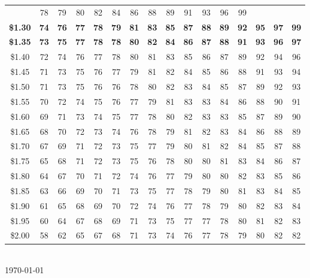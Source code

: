 \documentclass{article}
\begin{document}
\begin{tabular}{|c|*{15}{c}|}
& 78 & 79 & 80 & 82 & 84 & 86 & 88 & 89 & 91 & 93 & 96 & 99 & \\\textbf{\$1.30} & \textbf{74} & \textbf{76} & \textbf{77} & \textbf{78} & \textbf{79} & \textbf{81} & \textbf{83} & \textbf{85} & \textbf{87} & \textbf{88} & \textbf{89} & \textbf{92} & \textbf{95} & \textbf{97} & \textbf{99}\\\textbf{\$1.35} & \textbf{73} & \textbf{75} & \textbf{77} & \textbf{78} & \textbf{78} & \textbf{80} & \textbf{82} & \textbf{84} & \textbf{86} & \textbf{87} & \textbf{88} & \textbf{91} & \textbf{93} & \textbf{96} & \textbf{97}\\\$1.40 & 72 & 74 & 76 & 77 & 78 & 80 & 81 & 83 & 85 & 86 & 87 & 89 & 92 & 94 & 96\\\$1.45 & 71 & 73 & 75 & 76 & 77 & 79 & 81 & 82 & 84 & 85 & 86 & 88 & 91 & 93 & 94\\\$1.50 & 71 & 73 & 75 & 76 & 76 & 78 & 80 & 82 & 83 & 84 & 85 & 87 & 89 & 92 & 93\\\$1.55 & 70 & 72 & 74 & 75 & 76 & 77 & 79 & 81 & 83 & 83 & 84 & 86 & 88 & 90 & 91\\\$1.60 & 69 & 71 & 73 & 74 & 75 & 77 & 78 & 80 & 82 & 83 & 83 & 85 & 87 & 89 & 90\\\$1.65 & 68 & 70 & 72 & 73 & 74 & 76 & 78 & 79 & 81 & 82 & 83 & 84 & 86 & 88 & 89\\\$1.70 & 67 & 69 & 71 & 72 & 73 & 75 & 77 & 79 & 80 & 81 & 82 & 84 & 85 & 87 & 88\\\$1.75 & 65 & 68 & 71 & 72 & 73 & 75 & 76 & 78 & 80 & 80 & 81 & 83 & 84 & 86 & 87\\\$1.80 & 64 & 67 & 70 & 71 & 72 & 74 & 76 & 77 & 79 & 80 & 80 & 82 & 83 & 85 & 86\\\$1.85 & 63 & 66 & 69 & 70 & 71 & 73 & 75 & 77 & 78 & 79 & 80 & 81 & 83 & 84 & 85\\\$1.90 & 61 & 65 & 68 & 69 & 70 & 72 & 74 & 76 & 77 & 78 & 79 & 80 & 82 & 83 & 84\\\$1.95 & 60 & 64 & 67 & 68 & 69 & 71 & 73 & 75 & 77 & 77 & 78 & 80 & 81 & 82 & 83\\\$2.00 & 58 & 62 & 65 & 67 & 68 & 71 & 73 & 74 & 76 & 77 & 78 & 79 & 80 & 82 & 82\\
\hline
\end{tabular}\\
{\tiny\today}
\end{document}
